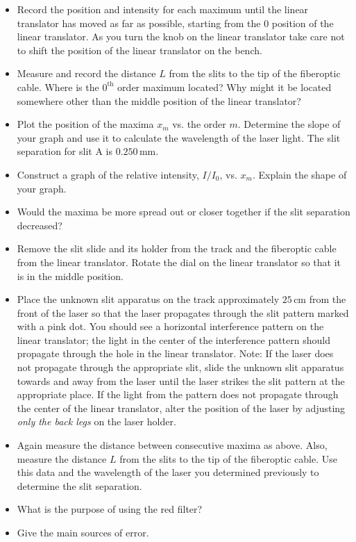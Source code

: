 \begin{itemize}
\item Record the position and intensity for each maximum until the linear translator has moved as far as possible, starting from the 0 position of the linear translator. As you turn the knob on the linear translator take care not to shift the position of the linear translator on the bench.

\item Measure and record the distance $L$ from the slits to the tip of the fiberoptic cable. Where is the $0^{\mathrm{th}}$ order maximum located? Why might it be located somewhere other than the middle position of the linear translator?

\item Plot the position of the maxima $x_{m}$ vs. the order $m$. Determine the slope of your graph and use it to calculate the wavelength of the laser light. The slit separation for slit A is $0.250\, \mathrm{mm}$.

\item Construct a graph of the relative intensity, $I/I_{0}$, vs. $x_{m}$. Explain the shape of your graph.

\item Would the maxima be more spread out or closer together if the slit separation decreased?

\item Remove the slit slide and its holder from the track and the fiberoptic cable from the linear translator. Rotate the dial on the linear translator so that it is in the middle position.

\item Place the unknown slit apparatus on the track approximately $25\,\mathrm{cm}$ from the front of the laser so that the laser propagates through the slit pattern marked with a pink dot. You should see a horizontal interference pattern on the linear translator; the light in the center of the interference pattern should propagate through the hole in the linear translator. Note: If the laser does not propagate through the appropriate slit, slide the unknown slit apparatus towards and away from the laser until the laser strikes the slit pattern at the appropriate place. If the light from the pattern does not propagate through the center of the linear translator, alter the position of the laser by adjusting \emph{only the back legs} on the laser holder.

\item Again measure the distance between consecutive maxima as above. Also, measure the distance $L$ from the slits to the tip of the fiberoptic cable. Use this data and the wavelength of the laser you determined previously to determine the slit separation.

\item What is the purpose of using the red filter?

\item Give the main sources of error.
\end{itemize}

